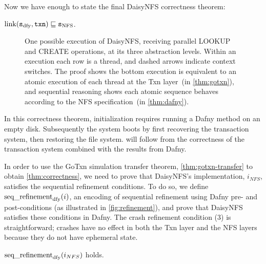 
\resume

Now we have enough to state the final DaisyNFS correctness theorem:
\begin{theorem}
  $\mathrm{link}(\texttt{s}_{\mathrm{dfy}}, \texttt{txn}) \sqsubseteq \texttt{s}_{\mathrm{NFS}}$.%
  \label{thm:correctness}
\end{theorem}

\begin{figure}
  \begin{center}
  
  \end{center}
  \vspace{-\baselineskip}
  \caption{One possible execution of DaisyNFS, receiving parallel LOOKUP and
    CREATE operations, at its three abstraction levels.
    Within an execution each row is a thread, and dashed arrows indicate
    context switches.
    The proof shows the bottom execution is equivalent to an atomic execution of
    each thread at
    the Txn layer~(in \cref{thm:gotxn}),
    and sequential reasoning shows each atomic sequence behaves according to the NFS
    specification~(in \cref{thm:dafny}).}
  \label{fig:refinement-execs}
\end{figure}

%
In this correctness theorem, initialization requires running a Dafny method on
an empty disk. Subsequently the system boots by first recovering the transaction
system, then restoring the file system.  will follow
from the correctness of the transaction system combined with the results from
Dafny.

In order to use the GoTxn simulation transfer theorem, \cref{thm:gotxn-transfer} to obtain \cref{thm:correctness}, we need to
prove that DaisyNFS's implementation, $i_{NFS}$, satisfies the sequential refinement conditions. To do so, we define
$\operatorname{seq\_refinement}_{\mathrm{dfy}}(i)$, an encoding of sequential refinement
using Dafny pre- and post-conditions (as illustrated in \cref{fig:refinement}), and prove that DaisyNFS
satisfies these conditions in Dafny. The crash refinement condition (3) is
straightforward; crashes have no effect in both the Txn layer and the NFS layers
because they do not have ephemeral state.

\begin{theorem} $\operatorname{seq\_refinement}_{\mathrm{dfy}}(i_{NFS})$ holds.
  \label{thm:dafny}
\end{theorem}

